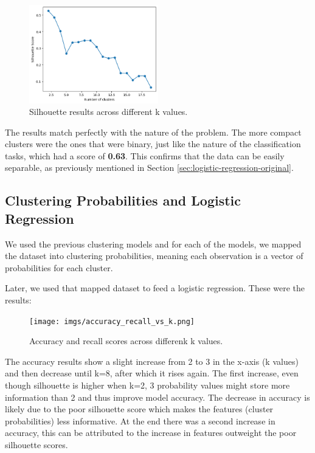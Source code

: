 \documentclass[a4paper,12pt]{article}
\begin{document}
\begin{figure}[H]
    \centering
    \includegraphics[width=0.5\textwidth]{imgs/silhouette.png}
    \caption{Silhouette results across different k values.}
    \label{fig:silhouette}
\end{figure}


The results match perfectly with the nature of the problem. The more compact clusters were the ones that were binary, just like the nature of the classification tasks, which had a score of \textbf{0.63}. This confirms that the data can be easily separable, as previously mentioned in Section \ref{sec:logistic-regression-original}.

\subsection{Clustering Probabilities and Logistic Regression}
We used the previous clustering models and for each of the models, we mapped the dataset into clustering probabilities, meaning each observation is a vector of probabilities for each cluster.

Later, we used that mapped dataset to feed a logistic regression. These were the results:

\begin{figure}
    \centering
    \texttt{[image: imgs/accuracy\_recall\_vs\_k.png]}
    \caption{Accuracy and recall scores across differenk k values.}
    \label{fig:enter-label}
\end{figure}


The accuracy results show a slight increase from 2 to 3 in the x-axis (k values) and then decrease until k=8, after which it rises again. The first increase, even though silhouette is higher when k=2, 3 probability values might store more information than 2 and thus improve model accuracy. The decrease in accuracy is likely due to the poor silhouette score which makes the features (cluster probabilities) less informative. At the end there was a second increase in accuracy, this can be attributed to the increase in features outweight the poor silhouette scores.
\end{document}
